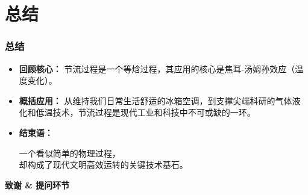 \documentclass{beamer}
\begin{document}
\section{总结}

\begin{frame}
  \frametitle{总结}
  \begin{itemize}
    \item \textbf{回顾核心：} 节流过程是一个\alert{等焓过程}，其应用的核心是\alert{焦耳-汤姆孙效应}（温度变化）。
    \vfill
    \item \textbf{概括应用：} 从维持我们日常生活舒适的\alert{冰箱空调}，到支撑尖端科研的\alert{气体液化}和\alert{低温技术}，节流过程是现代工业和科技中不可或缺的一环。
    \vfill
    \item \textbf{结束语：}
    \begin{center}
        一个看似简单的物理过程，\\
        却构成了现代文明高效运转的关键技术基石。
    \end{center}
  \end{itemize}
\end{frame}


\begin{frame}
    \begin{center}
        \Huge\bfseries
        致谢 \& 提问环节
    \end{center}
\end{frame}
\end{document}
